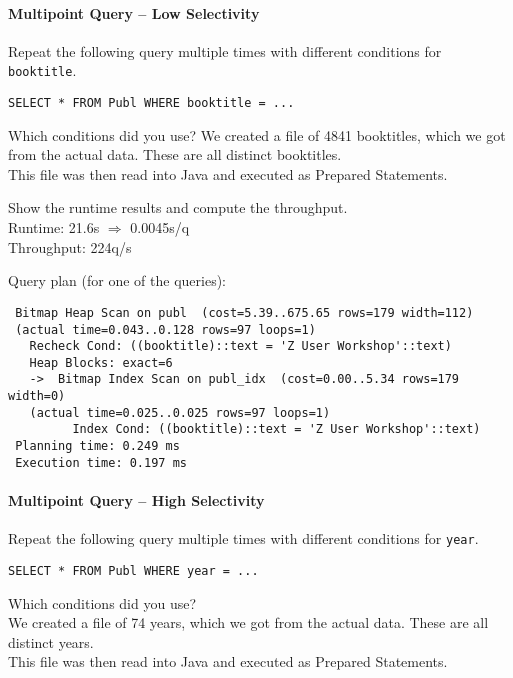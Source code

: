 \documentclass[11pt]{scrartcl}
\begin{document}
\paragraph{Multipoint Query -- Low Selectivity}

Repeat the following query multiple times with different conditions for {\tt booktitle}.

{\small
\begin{verbatim}
SELECT * FROM Publ WHERE booktitle = ...
\end{verbatim}
}

\noindent
Which conditions did you use?
We created a file of 4841 booktitles, which we got from the actual data. These are all distinct booktitles.\\
This file was then read into Java and executed as Prepared Statements.

\smallskip\noindent
Show the runtime results and compute the throughput.\\
Runtime: 21.6s $\Rightarrow$ 0.0045s/q\\
Throughput: 224q/s

\smallskip\noindent
Query plan (for one of the queries):
{\small
\begin{verbatim}
 Bitmap Heap Scan on publ  (cost=5.39..675.65 rows=179 width=112)
 (actual time=0.043..0.128 rows=97 loops=1)
   Recheck Cond: ((booktitle)::text = 'Z User Workshop'::text)
   Heap Blocks: exact=6
   ->  Bitmap Index Scan on publ_idx  (cost=0.00..5.34 rows=179 width=0)
   (actual time=0.025..0.025 rows=97 loops=1)
         Index Cond: ((booktitle)::text = 'Z User Workshop'::text)
 Planning time: 0.249 ms
 Execution time: 0.197 ms
\end{verbatim}
}


\paragraph{Multipoint Query -- High Selectivity}

Repeat the following query multiple times with different conditions for {\tt year}.

{\small
\begin{verbatim}
SELECT * FROM Publ WHERE year = ...
\end{verbatim}
}

\noindent
Which conditions did you use?\\
We created a file of 74 years, which we got from the actual data. These are all distinct years.\\
This file was then read into Java and executed as Prepared Statements.
\end{document}
